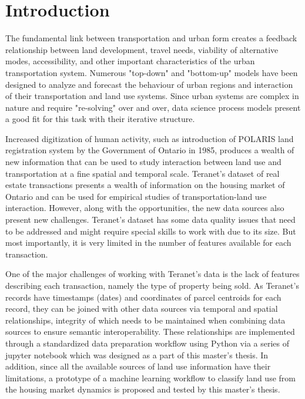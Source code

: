 \chapter[Introduction]{Introduction} \label{ch:introduction}

The fundamental link between transportation and urban form creates a feedback relationship between land development, travel needs, viability of alternative modes, accessibility, and other important characteristics of the urban transportation system.
Numerous "top-down" and "bottom-up" models have been designed to analyze and forecast the behaviour of urban regions and interaction of their transportation and land use systems.
Since urban systems are complex in nature and require "re-solving" over and over, data science process models present a good fit for this task with their iterative structure.

Increased digitization of human activity, such as introduction of POLARIS land registration system by the Government of Ontario in 1985, produces a wealth of new information that can be used to study interaction between land use and transportation at a fine spatial and temporal scale.
Teranet's dataset of real estate transactions presents a wealth of information on the housing market of Ontario and can be used for empirical studies of transportation-land use interaction.
However, along with the opportunities, the new data sources also present new challenges.
Teranet's dataset has some data quality issues that need to be addressed and might require special skills to work with due to its size.
But most importantly, it is very limited in the number of features available for each transaction.

One of the major challenges of working with Teranet's data is the lack of features describing each transaction, namely the type of property being sold.
As Teranet's records have timestamps (dates) and coordinates of parcel centroids for each record, they can be joined with other data sources via temporal and spatial relationships, integrity of which needs to be maintained when combining data sources to ensure semantic interoperability.
These relationships are implemented through a standardized data preparation workflow using Python via a series of jupyter notebook which was designed as a part of this master's thesis.
In addition, since all the available sources of land use information have their limitations, a prototype of a machine learning workflow to classify land use from the housing market dynamics is proposed and tested by this master's thesis.

